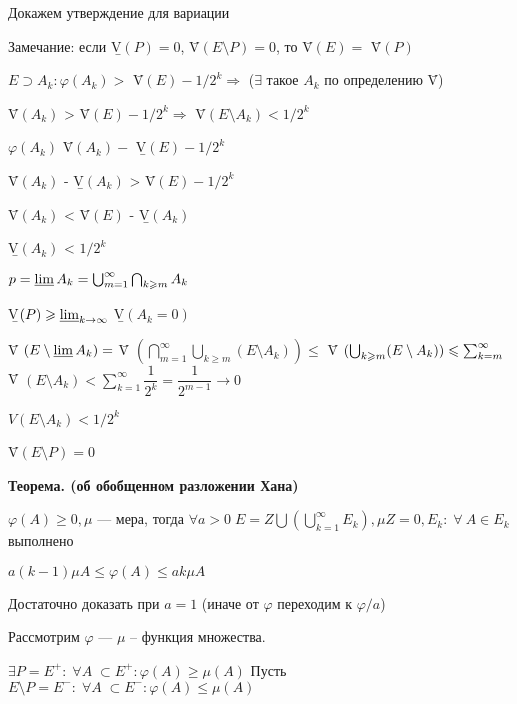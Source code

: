 Докажем утверждение для вариации

Замечание: если \b{V}$(P) = 0$, \={V}$(E \setminus P) = 0$, то
\={V}$(E) = $ \={V}$(P)$

$E \supset A_k : \varphi(A_k) >$ \={V}$(E) - 1/2^k \Rightarrow$
($\exists$ такое $A_k$  по определению \={V})

\={V}$(A_k)$ > \={V}$(E) - 1/2^k \Rightarrow $ \={V}$(E \setminus
A_k) < 1/2^k$

$\varphi(A_k)$ \={V}$(A_k) -$ \b{V}$(E) - 1/2^k$

\={V}$(A_k)$ - \b{V}$(A_k)$ > \={V}$(E) - 1/2^k$

\={V}$(A_k)$ < \={V}$(E)$ - \b{V}$(A_k)$

\b{V}$(A_k)$ < $1/2^k$

$p = \varliminf A_k = \bigcup_{m=1}^\infty \bigcap_{k \geqslant m}
A_k$

\b{V}$(P) \geqslant \varliminf_{k \rightarrow \infty}$ \b{V}$(A_k
= 0)$

\={V} $(E \setminus \varliminf A_k) = $ \={V}
$(\bigcap_{m=1}^\infty \bigcup_{k \geqslant m} (E \setminus A_k))
\leqslant$
 \={V}
$(\bigcup_{k \geqslant m} (E \setminus A_k))
\\ \leqslant \sum_{k = m}^\infty$
\={V}
$(E \setminus A_k) < \sum_{k=1}^\infty
\dfrac{1}{2^k} = \dfrac{1}{2^{m-1}} \rightarrow 0$

$V(E \setminus A_k) < 1/2^k$

\={V}$(E \setminus P) = 0$


\textbf{Теорема. (об обобщенном разложении Хана)} \quad

$\varphi(A) \geqslant 0, \mu $ --- мера, тогда $\forall a > 0 \; E
= Z \bigcup (\bigcup_{k = 1}^\infty E_k), \mu Z = 0, E_k: \;
\forall \: A \in E_k$ выполнено

$a(k - 1) \mu A \leqslant \varphi(A) \leqslant a k \mu A$


%
%
%
%
%
%
%
%
%
%
%
%

Достаточно доказать при $a = 1$ (иначе от $\varphi$ переходим к
$\varphi/a$)

Рассмотрим $\varphi$ --- $\mu$ -- функция множества.


 $\exists P = E^+ : \; \forall A \; \subset E^+ :
\varphi(A) \geqslant \mu(A)$ Пусть $E \setminus P = E^-: \;
\forall A \; \subset E^-: \varphi(A) \leqslant \mu(A)$

